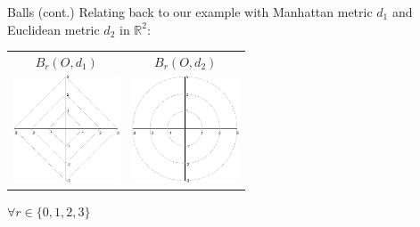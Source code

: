 \documentclass{beamer}
\begin{document}
\begin{frame}{Balls (cont.)}
    Relating back to our example with Manhattan metric $d_1$ and Euclidean metric $d_2$ in
    $\mathbb{R}^2$:

    \begin{block}{}
        \centering
        \begin{tabular}{c c}
            $B_r(O,d_1)$ & $B_r(O,d_2)$ \\
            \includegraphics[height=120]{balls2.pdf} &
            \includegraphics[height=120]{balls1.pdf}\\
        \end{tabular}
        $\forall r \in \{0,1,2,3\}$
    \end{block}

\end{frame}
\end{document}
